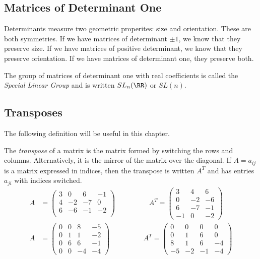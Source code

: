 \documentclass[fleqn]{report}
\begin{document}
\subsection{Matrices of Determinant One}
\label{determinant-one}

Determinants measure two geometric properites: size and
orientation. These are both symmetries. If we have matrices
of determinant $\pm 1$, we know that they preserve size. If we
have matrices of positive determinant, we know that they
preserve orientation. If we have matrices of determinant one,
they preserve both.

\begin{defn}
The group of matrices of determinant one with real
coefficients is called the \emph{Special Linear Group} and is
written $SL_n(\RR)$ or $SL(n)$.
\end{defn}

\subsection{Transposes}
\label{transpose}

The following definition will be useful in this chapter.

\begin{defn}
The \emph{transpose} of a matrix is the matrix formed by
switching the rows and columns. Alternatively, it is the mirror
of the matrix over the diagonal. If $A = a_{ij}$ is a matrix expressed
in indices, then the transpose is written $A^T$ and has entries
$a_{ji}$ with indices switched. 
\begin{align*}
A & = 
\left(
\begin{matrix}
3 & 0 & 6 & -1 \\
4 & -2 & -7 & 0 \\
6 & -6 & -1 & -2 \\
\end{matrix}
\right)
\hspace{2cm}
A^T = 
\left(
\begin{matrix}
3 & 4 & 6 \\
0 & -2 & -6 \\
6 & -7 & -1 \\
-1 & 0 & -2
\end{matrix}
\right)
\\
A & = 
\left(
\begin{matrix}
0 & 0 & 8 & -5 \\
0 & 1 & 1 & -2 \\
0 & 6 & 6 & -1 \\
0 & 0 & -4 & -4 
\end{matrix}
\right)
\hspace{2cm}
A^T = 
\left(
\begin{matrix}
0 & 0 & 0 & 0 \\
0 & 1 & 6 & 0 \\
8 & 1 & 6 & -4 \\
-5 & -2 & -1 & -4
\end{matrix}
\right)
\end{align*}
\end{defn}
\end{document}
